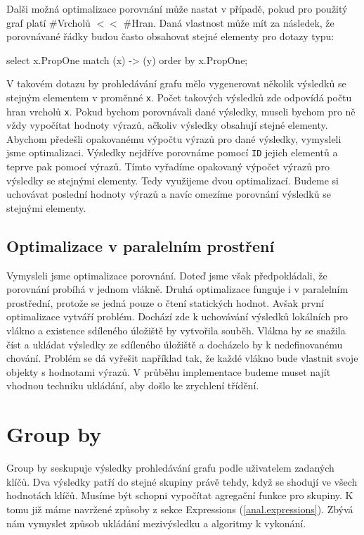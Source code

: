 Dalši možná optimalizace porovnání může nastat v případě, pokud pro použitý graf platí \#Vrcholů $<<$ \#Hran.
Daná vlastnost může mít za následek, že porovnávané řádky budou často obsahovat stejné elementy pro dotazy typu:
\begin{code}
select x.PropOne match (x) -> (y) order by x.PropOne;
\end{code}
V takovém dotazu by prohledávání grafu mělo vygenerovat několik výsledků se stejným elementem v proměnné \texttt{x}.
Počet takových výsledků zde odpovídá počtu hran vrcholů \texttt{x}.
Pokud bychom porovnávali dané výsledky, museli bychom pro ně vždy vypočítat hodnoty výrazů, ačkoliv výsledky obsahují stejné elementy.
Abychom předešli opakovanému výpočtu výrazů pro dané výsledky, vymysleli jsme optimalizaci.
Výsledky nejdříve porovnáme pomocí \texttt{ID} jejich elementů a teprve pak pomocí výrazů.
Tímto vyřadíme opakovaný výpočet výrazů pro výsledky se stejnými elementy.
Tedy využijeme dvou optimalizací.
Budeme si uchovávat poslední hodnoty výrazů a navíc omezíme porovnání výsledků se stejnými elementy.

\subsection{Optimalizace v paralelním prostření}

Vymysleli jsme optimalizace porovnání.
Doteď jsme však předpokládali, že porovnání probíhá v jednom vlákně.
Druhá optimalizace funguje i v paralelním prostřední, protože se jedná pouze o čtení statických hodnot.
Avšak první optimalizace vytváří problém.
Dochází zde k uchovávání výsledků lokálních pro vlákno a existence sdíleného úložiště by vytvořila souběh.
Vlákna by se snažila číst a ukládat výsledky ze sdíleného úložiště a docházelo by k nedefinovanému chování.
Problém se dá vyřešit například tak, že každé vlákno bude vlastnit svoje objekty s hodnotami výrazů.
V průběhu implementace budeme muset najít vhodnou techniku ukládání, aby došlo ke zrychlení třídění.

\section{Group by} \label{anal.groupby}

Group by seskupuje výsledky prohledávání grafu podle uživatelem zadaných klíčů.
Dva výsledky patří do stejné skupiny právě tehdy, když se shodují ve všech hodnotách klíčů.
Musíme být schopni vypočítat agregační funkce pro skupiny.
K tomu již máme navržené způsoby z sekce Expressions (\ref{anal.expressions}).
Zbývá nám vymyslet způsob ukládání mezivýsledku a algoritmy k vykonání.

